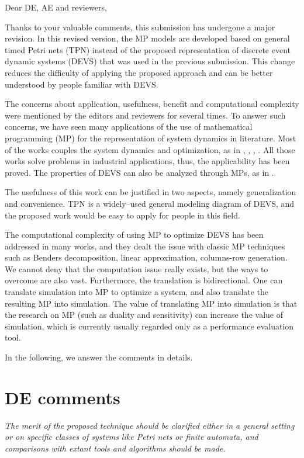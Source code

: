 \documentclass[suppldata]{interact}
\begin{document}
\noindent
Dear DE, AE and reviewers,

Thanks to your valuable %
comments, this submission has undergone a major revision. In this %
revised version, the MP models are developed based on general timed Petri nets (TPN) instead of the proposed representation of discrete event dynamic systems (DEVS) that was used in the previous submission. This change reduces the difficulty of applying the proposed approach and can be better understood by people familiar with DEVS.


The concerns about application, usefulness, benefit and computational complexity were mentioned by the editors and reviewers for several times. To answer such concerns, we have seen many applications of the use of mathematical programming (MP) for the representation of system dynamics in literature. Most of the works couples the system dynamics and optimization, as in \cite{di2020makespan}, \cite{weiss2015buffer}, \cite{bemporad1999control}, \cite{alfieri2020time}. All those works solve problems in industrial applications, thus, the applicability has been proved. The properties of DEVS can also be analyzed through MPs, as in \cite{basile2012k}.


The usefulness %
of this work can be justified in two aspects, namely generalization and convenience. TPN is a widely--used general modeling diagram of DEVS, and the proposed work would be easy to apply for people in this field.


The computational complexity of using MP to optimize DEVS has been %
addressed in many works, and they dealt the issue with classic MP techniques such as Benders decomposition, linear approximation, columns-row generation. We cannot deny that the computation issue really exists, but the ways to overcome are also vast. Furthermore, the translation is bidirectional. One can translate simulation into MP to optimize a system, and also translate the resulting MP into simulation. The value of translating MP into simulation is that the research on MP (such as duality and sensitivity) can %
increase the value of simulation, which is currently usually regarded only as a performance evaluation tool. 


In the following, we answer the comments in details. 



\section{DE comments}
\textit{The merit of the proposed technique should be clarified either in a general setting or on specific classes of systems like Petri nets or finite automata, and comparisons with extant tools and algorithms should be made.}
\end{document}
